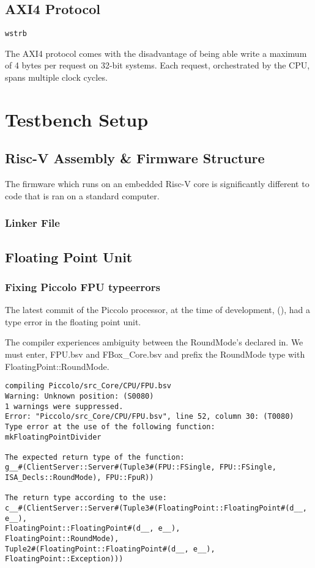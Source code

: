 \documentclass[a4paper,9pt]{report}
\begin{document}
\subsection{AXI4 Protocol}
\texttt{wstrb}

The AXI4 protocol comes with the disadvantage of being able write a maximum of 4
bytes per request on 32-bit systems. Each request, orchestrated by the CPU,
spans multiple clock cycles.





\section{Testbench Setup}
\subsection{Risc-V Assembly \& Firmware Structure}
The firmware which runs on an embedded Risc-V core is significantly different to
code that is ran on a standard computer. 

\subsubsection{Linker File}

\subsection{Floating Point Unit}
\subsubsection{Fixing Piccolo FPU typeerrors}
The latest commit of the Piccolo processor, at the time of development, (), had
a type error in the floating point unit. 

The compiler experiences ambiguity between the RoundMode's declared in. We must enter, FPU.bsv and FBox\_Core.bsv and prefix the RoundMode type with FloatingPoint::RoundMode.

\begin{verbatim}
compiling Piccolo/src_Core/CPU/FPU.bsv
Warning: Unknown position: (S0080)
1 warnings were suppressed.
Error: "Piccolo/src_Core/CPU/FPU.bsv", line 52, column 30: (T0080)
Type error at the use of the following function:
mkFloatingPointDivider

The expected return type of the function:
g__#(ClientServer::Server#(Tuple3#(FPU::FSingle, FPU::FSingle, ISA_Decls::RoundMode), FPU::FpuR))

The return type according to the use:
c__#(ClientServer::Server#(Tuple3#(FloatingPoint::FloatingPoint#(d__, e__),
FloatingPoint::FloatingPoint#(d__, e__),
FloatingPoint::RoundMode),
Tuple2#(FloatingPoint::FloatingPoint#(d__, e__), FloatingPoint::Exception)))
\end{verbatim}
\end{document}
